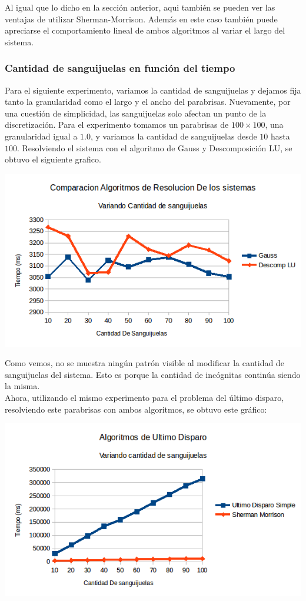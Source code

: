 Al igual que lo dicho en la sección anterior, aqui también se pueden ver las ventajas de utilizar Sherman-Morrison. Además en este caso también puede apreciarse el comportamiento lineal de ambos algoritmos al variar el largo del sistema.

\subsubsection{Cantidad de sanguijuelas en función del tiempo}
Para el siguiente experimento, variamos la cantidad de sanguijuelas y dejamos fija tanto la granularidad como el largo y el ancho del parabrisas. Nuevamente, por una cuestión de simplicidad, las sanguijuelas solo afectan un punto de la discretización. Para el experimento tomamos un parabrisas de $100 \times 100$, una granularidad igual a $1.0$, y variamos la cantidad de sanguijuelas desde $10$ hasta $100$. Resolviendo el sistema con el algoritmo de Gauss y Descomposición LU, se obtuvo el siguiente grafico.

\begin{center}
 \includegraphics[width=400pt]{imagenes/testeo/sangGauss.png}
\end{center}

Como vemos, no se muestra ningún patrón visible al modificar la cantidad de sanguijuelas del sistema. Esto es porque la cantidad de incógnitas continúa siendo la misma.
\\
Ahora, utilizando el mismo experimento para el problema del último disparo, resolviendo este parabrisas con ambos algoritmos, se obtuvo este gráfico:

\begin{center}
 \includegraphics[width=400pt]{imagenes/testeo/sangSalv.png}
\end{center}


